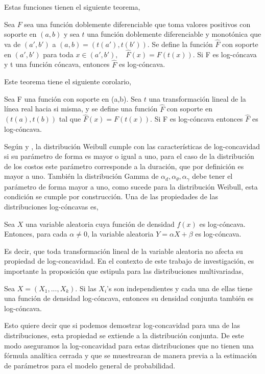 Estas funciones tienen el siguiente teorema,
\begin{teo}
Sea $F$ sea una funci\'on doblemente diferenciable que toma valores positivos con soporte en $(a,b)$ y sea $t$ una funci\'on doblemente diferenciable y monot\'onica que va de $(a',b')$ a $(a,b)=(t(a'),t(b'))$. Se define la funci\'on $\hat{F}$ con soporte en $(a',b')$ para toda $x \in (a',b'), \quad \hat{F}(x)=F(t(x))$. Si F es log-c\'oncava y t una funci\'on c\'oncava, entonces $\hat{F}$ es log-c\'oncava.
\end{teo}
Este teorema tiene el siguiente corolario,
\begin{cor}
Sea F una funci\'on con soporte en (a,b). Sea $t$ una transformaci\'on lineal de la l\'inea real hacia si misma, y se define una funci\'on $\hat{F}$ con soporte en $(t(a),t(b))$ tal que $\hat{F}(x)=F(t(x))$. Si F es log-c\'oncava entonces $\hat{F}$ es log-c\'oncava. 
\end{cor}
Seg\'un \cite{bagnoli2005log} y \cite{an1996log}, la distribuci\'on Weibull cumple con las caracter\'isticas de log-concavidad si su par\'ametro de forma es mayor o igual a uno, para el caso de la distribuci\'on de los costos este par\'ametro corresponde a la duraci\'on, que por definici\'on es mayor a uno. Tambi\'en la distribuci\'on Gamma de $\alpha_d,\alpha_\theta, \alpha_\gamma$ debe tener el par\'ametro de forma mayor a uno, como sucede para la distribuci\'on Weibull, esta condici\'on se cumple por construcci\'on. Una de las propiedades de las distribuciones log-c\'oncavas es,
\begin{prop}
Sea $X$ una variable aleatoria cuya funci\'on de densidad $f(x)$ es log-c\'oncava. Entonces, para cada $\alpha \neq 0$, la variable aleatoria $Y=\alpha X+\beta$ es log-c\'oncava.
\end{prop}
Es decir, que toda transformaci\'on lineal de la variable aleatoria no afecta su propiedad de log-concavidad. En el contexto de este trabajo de investigaci\'on, es importante la proposici\'on que estipula \cite{an1996log} para las distribuciones multivariadas,
\begin{prop}
Sea $X = (X_1,...,X_k)$. Si las $X_i$'s son independientes y cada una de ellas tiene una funci\'on de densidad log-c\'oncava, entonces su densidad conjunta tambi\'en es log-c\'oncava.
\end{prop}
Esto quiere decir que si podemos demostrar log-concavidad para una de las distribuciones, esta propiedad se extiende a la distribuci\'on conjunta. De este modo aseguramos la log-concavidad para estas distribuciones que no tienen una f\'ormula anal\'itica cerrada y que se muestrearan de manera previa a la estimaci\'on de par\'ametros para el modelo general de probabilidad.
